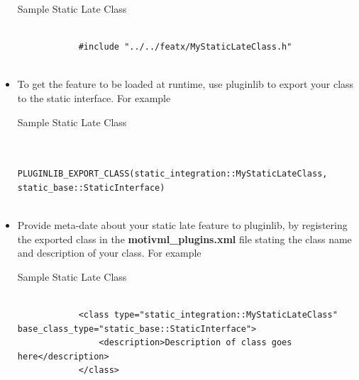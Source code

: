 \documentclass{article}
\newenvironment{longlisting}{\captionsetup{type=listing}}{}
\begin{document}
\begin{itemize}
	\begin{longlisting}
		\caption{Sample Static Late Class}
		\begin{verbatim}
			
			#include "../../featx/MyStaticLateClass.h"
			
		\end{verbatim}
		\label{samplestaticlateinclude}
	\end{longlisting}
	
	\item To get the feature to be loaded at runtime, use pluginlib to export your class to the static interface. For example 
	
	\begin{longlisting}
		\caption{Sample Static Late Class}
		\begin{verbatim}
			
			PLUGINLIB_EXPORT_CLASS(static_integration::MyStaticLateClass, static_base::StaticInterface)
			
		\end{verbatim}
		\label{pluginexport}
	\end{longlisting}
	
	\item Provide meta-date about your static late feature to pluginlib, by registering the exported class in the  \textbf{motivml\_plugins.xml} file stating the class name and description of your class. For example
	
	\begin{longlisting}
		\caption{Sample Static Late Class}
		\begin{verbatim}
			
			<class type="static_integration::MyStaticLateClass" base_class_type="static_base::StaticInterface">
				<description>Description of class goes here</description>
			</class>
			
		\end{verbatim}
		\label{samplestaticlatedesc}
	\end{longlisting}
	
\end{itemize}
\end{document}
